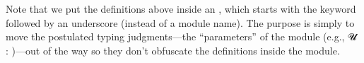 \begin{code}
\AgdaSpace{}%
\AgdaSymbol{:}\AgdaSpace{}%
\AgdaSymbol{\{}\AgdaSpace{}%
\AgdaSymbol{:}\AgdaSpace{}%
\AgdaSpace{}%
\AgdaSpace{}%
\AgdaSymbol{\}\{}\AgdaSpace{}%
\AgdaSymbol{:}\AgdaSpace{}%
\AgdaSpace{}%
\AgdaSpace{}%
\AgdaSpace{}%
\AgdaSpace{}%
\AgdaSymbol{\}}\AgdaSpace{}%
\AgdaSpace{}%
\AgdaSymbol{(}\AgdaSpace{}%
\AgdaSymbol{:}\AgdaSpace{}%
\AgdaSpace{}%
\AgdaSymbol{)}\AgdaSpace{}%
\AgdaSpace{}%
\AgdaSpace{}%
\AgdaSymbol{(}\AgdaSpace{}%
\AgdaSymbol{)}\<%
\\
%
\>[1]\AgdaSpace{}%
\AgdaSpace{}%
\AgdaOperator{\AgdaInductiveConstructor{,}}\AgdaSpace{}%
\AgdaSpace{}%
\AgdaSpace{}%
\AgdaSymbol{=}\AgdaSpace{}%
\<%
\\
%
\>[1]\AgdaSpace{}%
\AgdaSymbol{(}\AgdaSpace{}%
\AgdaOperator{\AgdaInductiveConstructor{,}}\AgdaSpace{}%
\AgdaSymbol{)}\AgdaSpace{}%
\AgdaSymbol{=}\AgdaSpace{}%
\<%
\end{code}
\ccpad
Note that we put the definitions above inside an , which starts with the  keyword followed by an underscore (instead of a module name). The purpose is simply to move the postulated typing judgments---the ``parameters'' of the module (e.g., \ab 𝓤 \as : )---out of the way so they don't obfuscate the definitions inside the module.
